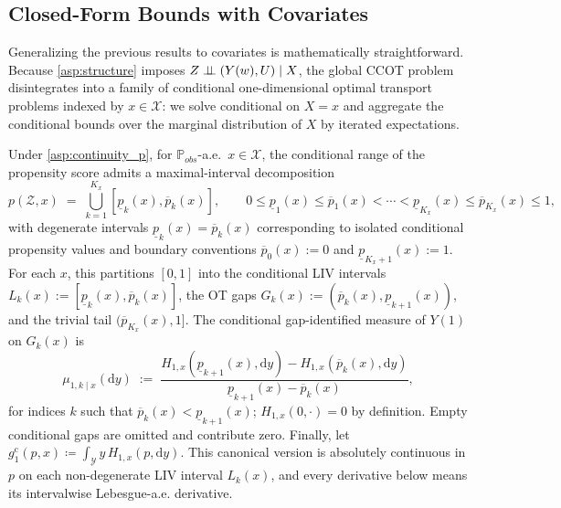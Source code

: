 \subsection{Closed-Form Bounds with Covariates}\label{subsec:cf_cov}

Generalizing the previous results to covariates is mathematically straightforward. Because \cref{asp:structure} imposes $Z \perp\!\!\!\perp (Y(w), U) \mid X$, the global CCOT problem disintegrates into a family of conditional one-dimensional optimal transport problems indexed by $x \in \mathcal{X}$: we solve conditional on $X=x$ and aggregate the conditional bounds over the marginal distribution of $X$ by iterated expectations.

Under \cref{asp:continuity_p}, for $\mathbb{P}_{obs}$-a.e.\ $x \in \mathcal{X}$, the conditional range of the propensity score admits a maximal-interval decomposition
\begin{equation}\label{eq:range_decomposition_cov}
    p(\mathcal{Z}, x) \;=\; \bigcup_{k=1}^{K_x}[\underline{p}_k(x), \overline{p}_k(x)], \qquad 0 \leqslant \underline{p}_1(x) \leqslant \overline{p}_1(x) < \cdots < \underline{p}_{K_x}(x) \leqslant \overline{p}_{K_x}(x) \leqslant 1,
\end{equation}
with degenerate intervals $\underline{p}_k(x) = \overline{p}_k(x)$ corresponding to isolated conditional propensity values and boundary conventions $\overline{p}_0(x) := 0$ and $\underline{p}_{K_x+1}(x) := 1$. For each $x$, this partitions $[0,1]$ into the conditional LIV intervals $L_k(x) := [\underline{p}_k(x), \overline{p}_k(x)]$, the OT gaps $G_k(x) := (\overline{p}_k(x), \underline{p}_{k+1}(x))$, and the trivial tail $(\overline{p}_{K_x}(x), 1]$. The conditional gap-identified measure of $Y(1)$ on $G_k(x)$ is
\begin{equation}\label{eq:gap_identified_measure_cov}
    \mu_{1,k\mid x}(\mathrm{d}y) \;:=\; \frac{H_{1,x}(\underline{p}_{k+1}(x),\mathrm{d}y)-H_{1,x}(\overline{p}_k(x),\mathrm{d}y)}{\underline{p}_{k+1}(x)-\overline{p}_k(x)},
\end{equation}
for indices $k$ such that $\overline p_k(x)<\underline p_{k+1}(x)$; $H_{1,x}(0,\cdot)=0$ by definition. Empty conditional gaps are omitted and contribute zero. Finally, let $g_1^{\mathrm c}(p,x)\coloneqq\int_{\mathcal Y}y\,H_{1,x}(p,\mathrm{d}y)$. This canonical version is absolutely continuous in $p$ on each non-degenerate LIV interval $L_k(x)$, and every derivative below means its intervalwise Lebesgue-a.e. derivative.

